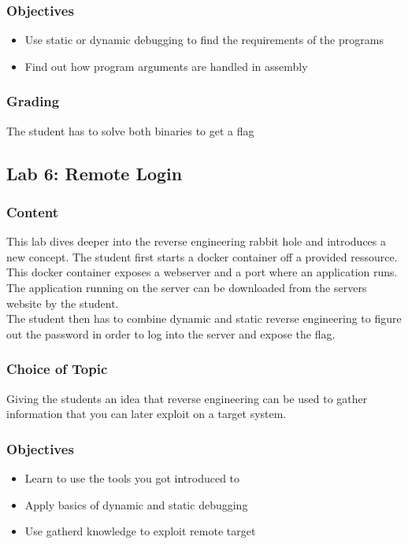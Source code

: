 \subsubsection*{Objectives}
\begin{itemize}
    \item Use static or dynamic debugging to find the requirements of the programs
    \item Find out how program arguments are handled in assembly
\end{itemize}
\subsubsection*{Grading}
The student has to solve both binaries to get a flag


\subsection{Lab 6: Remote Login}
\subsubsection*{Content}
This lab dives deeper into the reverse engineering rabbit hole and introduces a new concept. The student first starts a docker container off a provided ressource.
This docker container exposes a webserver and a port where an application runs. The application running on the server can be downloaded from the servers website by the student. \\
The student then has to combine dynamic and static reverse engineering to figure out the password in order to log into the server and expose the flag.
\subsubsection*{Choice of Topic}
Giving the students an idea that reverse engineering can be used to gather information that you can later exploit on a target system.
\subsubsection*{Objectives}
\begin{itemize}
    \item Learn to use the tools you got introduced to
    \item Apply basics of dynamic and static debugging
    \item Use gatherd knowledge to exploit remote target
\end{itemize}

